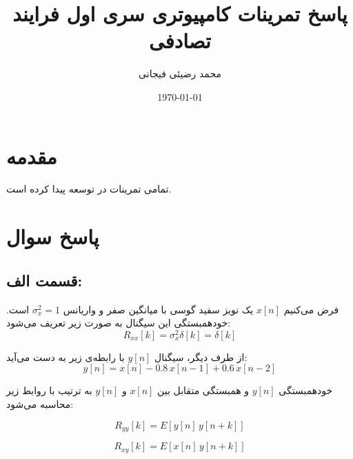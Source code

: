 \documentclass[12pt,onecolumn,a4paper]{article}
\author{
	محمد رضیئی فیجانی
	}
\title{
	پاسخ تمرینات کامپیوتری سری اول فرایند تصادفی
	}
\date{\today}
\newcommand\question{
	\section{پاسخ سوال \tartibi{section}}
}
\begin{document}
	
	
	\pagestyle{fancy}
	\maketitle
	
	\section*{مقدمه}
		تمامی تمرینات در 
		\cite{matlab2024a}
		توسعه پیدا کرده است.
		
		\FloatBarrier
		\question%
		
		\FloatBarrier
		\subsection{قسمت الف:}
		
		فرض می‌کنیم \( x[n] \) یک نویز سفید گوسی با میانگین صفر و واریانس \( \sigma_x^2 = 1 \) است. خودهمبستگی این سیگنال به صورت زیر تعریف می‌شود:
		\begin{equation}
			R_{xx}[k] = \sigma_x^2 \delta[k] = \delta[k]
		\end{equation}
	
		
		از طرف دیگر، سیگنال \( y[n] \) با رابطه‌ی زیر به دست می‌آید:
		\begin{equation}
			y[n] = x[n] - 0.8 \, x[n-1] + 0.6 \, x[n-2]
		\end{equation}
		
		خودهمبستگی \( y[n] \) و همبستگی متقابل بین \( x[n] \) و \( y[n] \) به ترتیب با روابط زیر محاسبه می‌شود:
		
		\begin{equation}
			R_{yy}[k] = E[y[n] \, y[n+k]]
		\end{equation}
		
		\begin{equation}
			R_{xy}[k] = E[x[n] \, y[n+k]]
		\end{equation}
		
\end{document}
